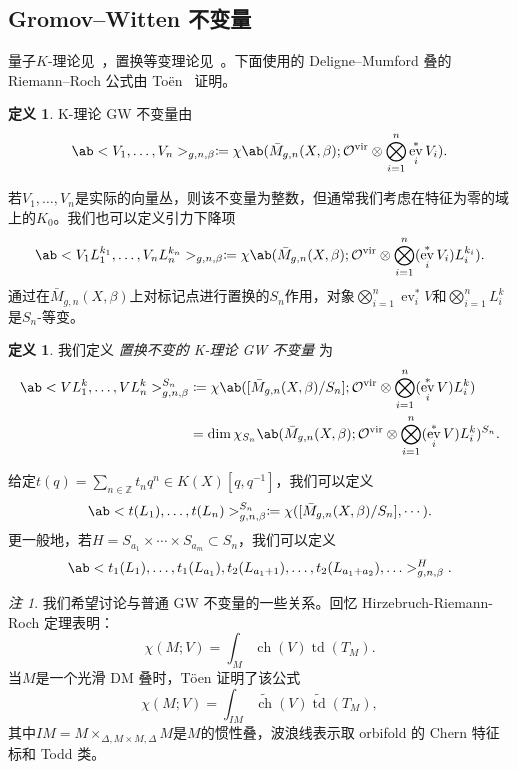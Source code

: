 \documentclass{amsart}
\theoremstyle{definition}
\newtheorem{defn}[thm]{定义}
\theoremstyle{remark}
\newtheorem{rmk}[thm]{注}
\theoremstyle{plain}
\theoremstyle{definition}
\theoremstyle{remark}
\newcommand{\Z}{\mathbb{Z}}
\newcommand{\mc}[1]{\mathcal{#1}}
\newcommand{\mr}[1]{\mathrm{#1}}
\newcommand{\on}[1]{\operatorname{#1}}
\newcommand{\wt}[1]{\widetilde{#1}}
\newcommand{\1}{\mathbf{1}}
\newcommand{\2}{\mathbf{2}}
\newcommand{\3}{\mathbf{3}}
\newcommand{\vir}{\mr{vir}}
\DeclareMathOperator{\ev}{ev}
\begin{document}
\subsection{Gromov--Witten 不变量}%
\label{sub:KGW invariants}

量子\(K\)-理论见~\cite{Lee2004}，置换等变理论见~\cite{Givental2017K1,GiventalK7}。下面使用的 Deligne--Mumford 叠的 Riemann--Roch 公式由 To\"en~\cite{Toen1999} 证明。

\begin{defn}
K-理论 GW 不变量由
    \[ \ab<V_1, \ldots, V_n>_{g,n,\beta} \coloneqq \chi\ab(\bar{M}_{g,n}(X, \beta); \mc{O}^{\vir} \otimes \bigotimes_{i=1}^n \ev_i^* V_i). \]
\end{defn}

若\(V_1, \ldots, V_n\)是实际的向量丛，则该不变量为整数，但通常我们考虑在特征为零的域上的\(K_0\)。我们也可以定义引力下降项
\[ \ab<V_1 L_1^{k_1}, \ldots, V_n L_n^{k_n}>_{g,n,\beta} \coloneqq \chi\ab(\bar{M}_{g,n}(X, \beta); \mc{O}^{\vir} \otimes \bigotimes_{i=1}^n ( \ev_i^* V_i )L_i^{k_i} ). \]
通过在\(\bar{M}_{g,n}(X, \beta)\)上对标记点进行置换的\(S_n\)作用，对象\(\bigotimes_{i=1}^n \ev_i^* V\)和\(\bigotimes_{i=1}^n L_i^k\)是\(S_n\)-等变。

\begin{defn}
    我们定义 \textit{置换不变的 K-理论 GW 不变量} 为
    \begin{align*}
        \ab<V L_1^k, \ldots, V L_n^k>_{g,n,\beta}^{S_n} &\coloneqq \chi\ab([ \bar{M}_{g,n}(X, \beta)/S_n ]; \mc{O}^{\vir} \otimes \bigotimes_{i=1}^n ( \ev_i^* V ) L_i^k) \\
        &= \dim \chi_{S_n} \ab(\bar{M}_{g,n}(X, \beta); \mc{O}^{\vir} \otimes \bigotimes_{i=1}^n ( \ev_i^* V ) L_i^k )^{S_n}.
    \end{align*}
\end{defn}

给定\(t(q) = \sum_{n \in \Z} t_n q^n \in K(X)[q,q^{-1}]\)，我们可以定义
\[ \ab< t(L_1), \ldots, t(L_n)>^{S_n}_{g,n,\beta} \coloneqq \chi ([\bar{M}_{g,n}(X,\beta)/S_n], \cdots). \]
更一般地，若\(H = S_{a_1} \times \cdots \times S_{a_m} \subset S_n\)，我们可以定义
\[ \ab<t_1(L_1), \ldots, t_1(L_{a_1}), t_2(L_{a_1+1}), \ldots, t_2(L_{a_1+a_2}), \ldots>_{g,n,\beta}^H. \]

\begin{rmk}
我们希望讨论与普通 GW 不变量的一些关系。回忆 Hirzebruch-Riemann-Roch 定理表明：
    \[ \chi(M; V) = \int_M \on{ch}(V) \on{td}(T_M). \]
当\(M\)是一个光滑 DM 叠时，T\"oen 证明了该公式
    \[ \chi(M; V) = \int_{IM} \wt{\on{ch}}(V) \wt{\on{td}}(T_M), \]
其中\(IM = M \times_{\Delta, M \times M, \Delta} M\)是\(M\)的惯性叠，波浪线表示取 orbifold 的 Chern 特征标和 Todd 类。
\end{rmk}
\end{document}
